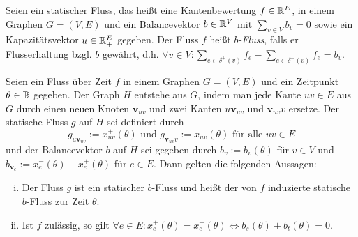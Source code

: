 
\begin{definition}
	Seien ein statischer Fluss, das heißt eine Kantenbewertung $f \in \mathbb{R}^E$, in einem Graphen $G=(V,E)$ und ein Balancevektor $b\in\mathbb{R}^V$ mit $\sum_{v\in V} b_v = 0$ sowie ein Kapazitätsvektor $u\in\mathbb{R}_+^E$ gegeben.
	Der Fluss $f$ heißt \emph{$b$-Fluss}, falls er Flusserhaltung bzgl. $b$ gewährt, d.h. $\forall v\in V: \sum_{e\in\delta^+(v)}f_e - \sum_{e\in\delta^-(v)}f_e = b_v$.
\end{definition}


\newcommand{\newv}{\mathbf{v}}
\begin{lemma}\label{lemma-b-graph}
	Seien ein Fluss über Zeit $f$ in einem Graphen $G=(V,E)$ und ein Zeitpunkt $\theta\in\mathbb{R}$ gegeben.
	Der Graph $H$ entstehe aus $G$, indem man jede Kante $uv\in E$ aus $G$ durch einen neuen Knoten $\newv_{uv}$ und zwei Kanten $u\newv_{uv}$ und $\newv_{uv}v$ ersetze.
	Der statische Fluss $g$ auf $H$ sei definiert durch
	$$g_{u\newv_{uv}} := x_{uv}^+(\theta) \text{ und } g_{\newv_{uv}v} := x_{uv}^-(\theta) \text{ für alle $uv\in E$}$$
	und der Balancevektor $b$ auf $H$ sei gegeben durch $b_v:= b_v(\theta)$ für $v\in V$ und $b_{\newv_e}:= x_e^-(\theta) - x_e^+(\theta)$ für $e\in E$.
	Dann gelten die folgenden Aussagen:
	
	\begin{enumerate}[(i)]
		\item Der Fluss $g$ ist ein statischer $b$-Fluss und heißt der von $f$ induzierte statische $b$-Fluss zur Zeit $\theta$.
		\item\label{lemma-b-graph-imp} Ist $f$ zulässig, so gilt $\forall e\in E : x_e^+(\theta) = x_e^-(\theta)\iff b_s(\theta) + b_t(\theta) = 0$.
	\end{enumerate}
\end{lemma} 
